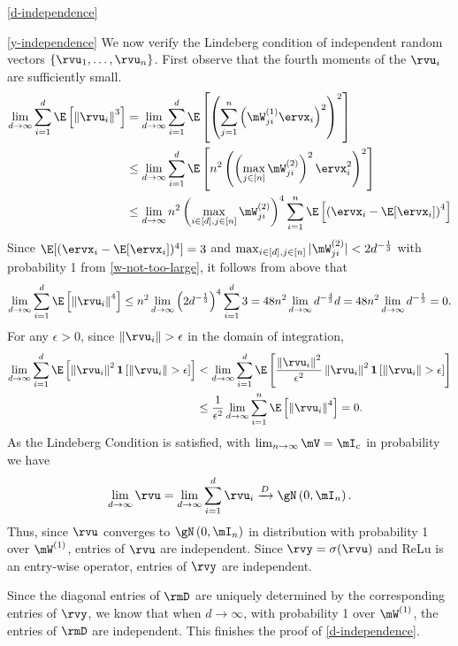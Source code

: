 \begin{proofof}{\cref{d-independence}}
\begin{proofof}{\cref{y-independence}}
We now verify the Lindeberg condition of independent random vectors $\{\rvu_1,\ldots, \rvu_n\}$.
First observe that the fourth moments of the $\rvu_i$ are sufficiently small.
\begin{equation}
\begin{split}
    \lim_{d\to\infty}\sum_{i=1}^d\E\left[\left\Vert\rvu_i\right\Vert^3\right] &= \lim_{d\to\infty}\sum_{i=1}^d\E\left[\left(\sum_{j=1}^n \left(\mW^{(1)}_{ji}\ervx_i\right)^2\right)^2\right]\\
    & \leq\lim_{d\to\infty} \sum_{i=1}^d\E\left[n^2\left(\left(\max_{j\in[n]}\mW^{(2)}_{ji}\right)^2\ervx_i^2\right)^2\right]\\
    & \leq\lim_{d\to\infty} n^2\left(\max_{i\in[d],j\in[n]}\mW^{(2)}_{ji}\right)^4\sum_{i=1}^n\E\left[\left(\ervx_i - \E[\ervx_i]\right)^4\right]
\end{split}
\end{equation}
Since $\E[(\ervx_i - \E[\ervx_i])^4] = 3$ and $\max_{i\in[d],j\in[n]}|\mW^{(2)}_{ji}| < 2d^{-\frac13}$ with probability 1 from \cref{w-not-too-large}, it follows from above that
\begin{equation}
\begin{split}
    \lim_{d\to\infty}\sum_{i=1}^d\E\left[\left\Vert\rvu_i\right\Vert^4\right] \leq n^2\lim_{d\to\infty}\left(2d^{-\frac13}\right)^4\sum_{i=1}^d 3 = 48n^2 \lim_{d\to\infty}d^{-\frac43}d =  48n^2 \lim_{d\to\infty}d^{-\frac13} =0.
\end{split}
\end{equation}
For any $\epsilon > 0$, since $\left\Vert\rvu_{i}\right\Vert > \epsilon$ in the domain of integration,
\begin{equation}
\begin{split}
\lim_{d\to\infty}\sum_{i=1}^d\E\left[\left\Vert\rvu_i\right\Vert^2\textbf{1}\left[\left\Vert\rvu_{i}\right\Vert > \epsilon\right]\right] & < \lim_{d\to\infty}\sum_{i=1}^d\E\left[\frac{\left\Vert\rvu_i\right\Vert^2}{\epsilon^2}\left\Vert\rvu_i\right\Vert^2\textbf{1}\left[\left\Vert\rvu_{i}\right\Vert > \epsilon\right]\right]\\
&\leq \frac{1}{\epsilon^2}\lim_{d\to\infty}\sum_{i=1}^n\E\left[\left\Vert\rvu_i\right\Vert^4\right] = 0.
\end{split}
\end{equation}
As the Lindeberg Condition is satisfied, with $\lim_{n\to\infty}\mV = \mI_c$ in probability we have
\begin{equation}
   \lim_{d\to\infty}\rvu= \lim_{d\to\infty}\sum_{i=1}^d\rvu_i\xrightarrow{D}\gN\left(0,\mI_n\right).
\end{equation}
Thus, since $\rvu$ converges to $\gN\left(0,\mI_n\right)$ in distribution with probability 1 over $\mW^{(1)}$, entries of $\rvu$ are independent. Since $\rvy = \sigma(\rvu)$ and ReLu is an entry-wise operator, entries of $\rvy$ are independent.
\end{proofof}
Since the diagonal entries of $\rmD$ are uniquely determined by the corresponding entries of $\rvy$, we know that when $d\to\infty$, with probability 1 over $\mW^{(1)}$, the entries of $\rmD$ are independent. This finishes the proof of \cref{d-independence}.
\end{proofof}
